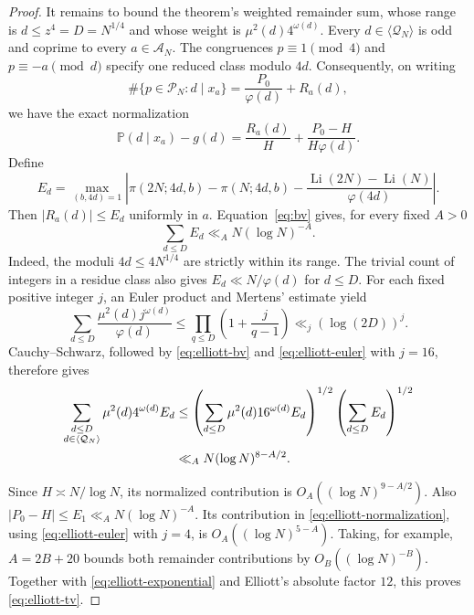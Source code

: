\documentclass[11pt]{article}
\theoremstyle{remark}\newtheorem{remark}[theorem]{Remark}
\newcommand{\Li}{\operatorname{Li}}
\newcommand{\Prob}{\mathbb P}
\begin{document}
\begin{proof}
It remains to bound the theorem's weighted remainder sum, whose range
is $d\le z^4=D=N^{1/4}$ and whose weight is
$\mu^2(d)4^{\omega(d)}$. Every $d\in\langle\mathcal Q_N\rangle$
is odd and coprime to every $a\in\mathcal A_N$. The congruences
$p\equiv1\pmod4$ and $p\equiv-a\pmod d$ specify one reduced class
modulo $4d$. Consequently, on writing
\[
 \#\{p\in\mathcal P_N:d\mid x_a\}
   =\frac{P_0}{\varphi(d)}+R_a(d),
\]
we have the exact normalization
\begin{equation}\label{eq:elliott-normalization}
 \Prob(d\mid x_a)-g(d)
 =\frac{R_a(d)}H+\frac{P_0-H}{H\varphi(d)}.
\end{equation}
Define
\[
 E_d=\max_{(b,4d)=1}
 \left|\pi(2N;4d,b)-\pi(N;4d,b)
       -\frac{\Li(2N)-\Li(N)}{\varphi(4d)}\right|.
\]
Then $|R_a(d)|\le E_d$ uniformly in $a$. Equation~\eqref{eq:bv} gives, for every fixed $A>0$
\begin{equation}\label{eq:elliott-bv}
 \sum_{d\le D}E_d\ll_A N(\log N)^{-A}.
\end{equation}
Indeed, the moduli $4d\le4N^{1/4}$ are strictly within its range.
The trivial count of integers in a residue class also gives
$E_d\ll N/\varphi(d)$ for $d\le D$.
For each fixed positive integer $j$, an Euler product and Mertens'
estimate yield
\begin{equation}\label{eq:elliott-euler}
 \sum_{d\le D}\frac{\mu^2(d)j^{\omega(d)}}{\varphi(d)}
 \le\prod_{q\le D}\left(1+\frac j{q-1}\right)
 \ll_j(\log(2D))^j.
\end{equation}
Cauchy--Schwarz, followed by \eqref{eq:elliott-bv} and
\eqref{eq:elliott-euler} with $j=16$, therefore gives
\begin{align}
 \sum_{\substack{d\le D\\d\in\langle\mathcal Q_N\rangle}}
       \mu^2(d)4^{\omega(d)}E_d
 &\le
 \left(\sum_{d\le D}\mu^2(d)16^{\omega(d)}E_d\right)^{1/2}
 \left(\sum_{d\le D}E_d\right)^{1/2}\notag\\
 &\ll_A N(\log N)^{8-A/2}.\label{eq:elliott-weighted-bv}
\end{align}

Since $H\asymp N/\log N$, its normalized contribution is
$O_A((\log N)^{9-A/2})$.
Also $|P_0-H|\le E_1\ll_A N(\log N)^{-A}$. Its contribution in
\eqref{eq:elliott-normalization}, using
\eqref{eq:elliott-euler} with $j=4$, is
$O_A((\log N)^{5-A})$.
Taking, for example, $A=2B+20$ bounds both remainder contributions
by $O_B((\log N)^{-B})$. Together with
\eqref{eq:elliott-exponential} and Elliott's absolute factor $12$,
this proves \eqref{eq:elliott-tv}.
\end{proof}
\end{document}

